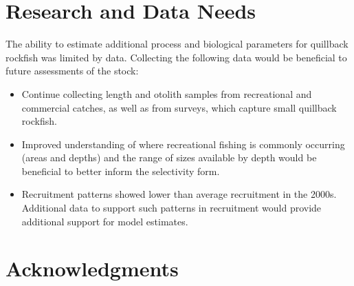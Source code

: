 \documentclass[11pt,
  english,
  a4paper,
]{article}
\begin{document}
\leavevmode\tagmcend\tagstructend\par


\hypertarget{research-and-data-needs}{%
\section{Research and Data Needs}\label{research-and-data-needs}}

\leavevmode\tagmcend\tagstructend


The ability to estimate additional process and biological parameters for quillback rockfish was limited by data. Collecting the following data would be beneficial to future assessments of the stock:

\leavevmode\tagmcend\tagstructend\par

\begin{itemize}

    \item Continue collecting length and otolith samples from recreational and commercial catches, as well as from surveys, which capture small quillback rockfish.

    \item Improved understanding of where recreational fishing is commonly occurring (areas and depths) and the range of sizes available by depth would be beneficial to better inform the selectivity form.  
    
    \item Recruitment patterns showed lower than average recruitment in the 2000s. Additional data to support such patterns in recruitment would provide additional support for model estimates.  
    
\end{itemize}


\hypertarget{acknowledgments}{%
\section{Acknowledgments}\label{acknowledgments}}

\leavevmode\tagmcend\tagstructend

\end{document}
